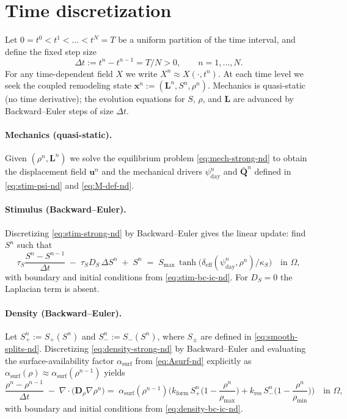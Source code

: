 \section*{Time discretization}
\label{sec:be-time}

Let $0=t^0<t^1<\dots<t^N=T$ be a uniform partition of the time interval, and define the fixed step size
\[
\Delta t := t^{n}-t^{n-1}=T/N>0,\qquad n=1,\dots,N.
\]
For any time-dependent field $X$ we write $X^n \approx X(\cdot,t^n)$.
At each time level we seek the coupled remodeling state $\mathbf{x}^n:=(\mathbf{L}^n,S^n,\rho^n)$.
Mechanics is quasi-static (no time derivative); the evolution equations for $S$, $\rho$, and $\mathbf{L}$ are advanced by Backward--Euler steps of size $\Delta t$.

\paragraph{Mechanics (quasi-static).}
Given $(\rho^n,\mathbf{L}^n)$ we solve the equilibrium problem \eqref{eq:mech-strong-nd} to obtain the displacement field $\mathbf{u}^n$ and the mechanical drivers $\psi_{\mathrm{day}}^n$ and $\bar{\mathbf{Q}}^n$ defined in \eqref{eq:stim-psi-nd} and \eqref{eq:M-def-nd}.

\paragraph{Stimulus (Backward--Euler).}
Discretizing \eqref{eq:stim-strong-nd} by Backward--Euler gives the linear update: find $S^n$ such that
\begin{equation}\label{eq:be-stim}
\tau_S\frac{S^{n}-S^{n-1}}{\Delta t}\;-\;\tau_S D_S\,\Delta S^{n}\;+\;S^{n}
\;=\; S_{\max}\,\tanh\!\Big(\delta_{\mathrm{eff}}(\psi_{\mathrm{day}}^{n},\rho^{n})/\kappa_S\Big)\quad\text{in }\Omega,
\end{equation}
with boundary and initial conditions from \eqref{eq:stim-bc-ic-nd}. For $D_S=0$ the Laplacian term is absent.

\paragraph{Density (Backward--Euler).}
Let $S_+^n:=S_+(S^n)$ and $S_-^n:=S_-(S^n)$, where $S_\pm$ are defined in \eqref{eq:smooth-splits-nd}. Discretizing \eqref{eq:density-strong-nd} by Backward--Euler and evaluating the surface-availability factor $\alpha_{\mathrm{surf}}$ from \eqref{eq:Asurf-nd} explicitly as $\alpha_{\mathrm{surf}}(\rho)\approx \alpha_{\mathrm{surf}}(\rho^{n-1})$ yields
\begin{equation}\label{eq:be-rho}
\frac{\rho^{n}-\rho^{n-1}}{\Delta t}\;-\;\nabla\!\cdot\!\big(\mathbf{D}_\rho\nabla\rho^{n}\big)
=\;\alpha_{\mathrm{surf}}(\rho^{n-1})\Big(
k_{\mathrm{form}}\,S_+^{n}\Big(1-\frac{\rho^{n}}{\rho_{\max}}\Big)
+k_{\mathrm{res}}\,S_-^{n}\Big(1-\frac{\rho^{n}}{\rho_{\min}}\Big)
\Big)\quad\text{in }\Omega,
\end{equation}
with boundary and initial conditions from \eqref{eq:density-bc-ic-nd}.

